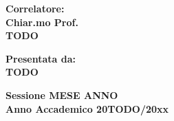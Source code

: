 \documentclass[12pt,a4paper,openright,twoside]{report}
\begin{document}
\begin{titlepage}
\begin{minipage}[t]{0.50\textwidth}
			\large{\bf Correlatore: \\
				Chiar.mo Prof. \\
				TODO}
		\end{minipage}
		\hfill
		\begin{minipage}[t]{0.47\textwidth}\raggedleft
			{\large{\bf Presentata da:\\
					TODO}}
		\end{minipage}
		
		\vspace{10mm}
		\begin{center}
			{\large{\bf Sessione MESE ANNO \\}}
			{\large{\bf Anno Accademico 20TODO/20xx\\}}
		\end{center}
	\end{titlepage}
	\clearpage{\pagestyle{empty}\cleardoublepage}
	\cleardoublepage
	\tableofcontents
	\cleardoublepage
	\listoffigures
	\cleardoublepage
	\listoftables
	\clearpage{\pagestyle{empty}\cleardoublepage}
\end{document}
